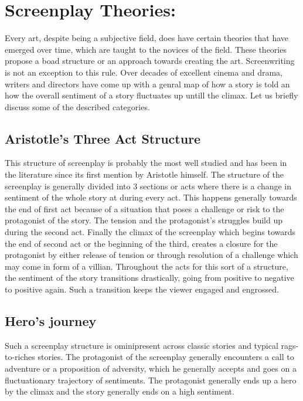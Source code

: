 \section{Screenplay Theories:}
Every art, despite being a subjective field, does have certain theories that have emerged over time, which are taught to the novices of the field. These theories propose a boad structure or an approach towards creating the art. Screenwriting is not an exception to this rule. Over decades of excellent cinema and drama, writers and directors have come up with a genral map of how a story is told an how the overall sentiment of a story fluctuates up untill the climax. Let us briefly discuss some of the described categories. 

\subsection{Aristotle's Three Act Structure}{
This structure of screenplay is probably the most well studied and has been in the literature since its first mention by Aristotle himself. The structure of the screenplay is generally divided into 3 sections or acts where there is a change in sentiment of the whole story at during every act. This happens generally towards the end of first act because of a situation that poses a challenge or risk to the protagonist of the story. The tension and the protagonist's struggles build up during the second act. Finally the climax of the screenplay which begins towards the end of second act or the beginning of the third, creates a closure for the protagonist by either release of tension or through resolution of a challenge which may come in form of a villian. Throughout the acts for this sort of a structure, the sentiment of the story transitions drastically, going from positive to negative to positive again. Such a transition keeps the viewer engaged and engrossed. }

\subsection{Hero's journey}{
Such a screenplay structure is ominipresent across classic stories and typical rags-to-riches stories. The protagonist of the screenplay generally encounters a call to adventure or a proposition of adversity, which he generally accepts and goes on a fluctuationary trajectory of sentiments. The protagonist generally ends up a hero by the climax and the story generally ends on a high sentiment.}

